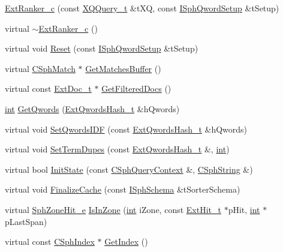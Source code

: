 \begin{DoxyCompactItemize}
\item 
\hyperlink{classExtRanker__c_a4e005df251b91f8f8b4f5cc6a49015ad}{Ext\-Ranker\-\_\-c} (const \hyperlink{structXQQuery__t}{X\-Q\-Query\-\_\-t} \&t\-X\-Q, const \hyperlink{classISphQwordSetup}{I\-Sph\-Qword\-Setup} \&t\-Setup)
\item 
virtual \hyperlink{classExtRanker__c_a49b52daf44c9aa3aeccb3d747aefd079}{$\sim$\-Ext\-Ranker\-\_\-c} ()
\item 
virtual void \hyperlink{classExtRanker__c_a7d94b8c6d73ac70da2efac6aff5874aa}{Reset} (const \hyperlink{classISphQwordSetup}{I\-Sph\-Qword\-Setup} \&t\-Setup)
\item 
virtual \hyperlink{classCSphMatch}{C\-Sph\-Match} $\ast$ \hyperlink{classExtRanker__c_a1e3ba87f4108a2d37a7d6feabe6b634c}{Get\-Matches\-Buffer} ()
\item 
virtual const \hyperlink{structExtDoc__t}{Ext\-Doc\-\_\-t} $\ast$ \hyperlink{classExtRanker__c_a0a7b47ff312794eaf57bce514f64ae78}{Get\-Filtered\-Docs} ()
\item 
\hyperlink{sphinxexpr_8cpp_a4a26e8f9cb8b736e0c4cbf4d16de985e}{int} \hyperlink{classExtRanker__c_a4ac4b90c7223f6ff51fe5dd9aba3794d}{Get\-Qwords} (\hyperlink{sphinxsearch_8cpp_a814fc096e1ffb29d072d79b72b702fe6}{Ext\-Qwords\-Hash\-\_\-t} \&h\-Qwords)
\item 
virtual void \hyperlink{classExtRanker__c_a9538a7ce00ed461791964f7cbe4bd9ba}{Set\-Qwords\-I\-D\-F} (const \hyperlink{sphinxsearch_8cpp_a814fc096e1ffb29d072d79b72b702fe6}{Ext\-Qwords\-Hash\-\_\-t} \&h\-Qwords)
\item 
virtual void \hyperlink{classExtRanker__c_a67136ec62d730896791fa09f46f468a7}{Set\-Term\-Dupes} (const \hyperlink{sphinxsearch_8cpp_a814fc096e1ffb29d072d79b72b702fe6}{Ext\-Qwords\-Hash\-\_\-t} \&, \hyperlink{sphinxexpr_8cpp_a4a26e8f9cb8b736e0c4cbf4d16de985e}{int})
\item 
virtual bool \hyperlink{classExtRanker__c_aa7bb9acb4259f8c5d4098f9dee0d192e}{Init\-State} (const \hyperlink{classCSphQueryContext}{C\-Sph\-Query\-Context} \&, \hyperlink{structCSphString}{C\-Sph\-String} \&)
\item 
virtual void \hyperlink{classExtRanker__c_a15236d1c058e289ce1cf8e9001999c7a}{Finalize\-Cache} (const \hyperlink{classISphSchema}{I\-Sph\-Schema} \&t\-Sorter\-Schema)
\item 
virtual \hyperlink{sphinxint_8h_a988ad80ed2f21b4c66b7fe2bdfa18ad9}{Sph\-Zone\-Hit\-\_\-e} \hyperlink{classExtRanker__c_ae69d99b0d9c3b65c2f56722802a7d6f9}{Is\-In\-Zone} (\hyperlink{sphinxexpr_8cpp_a4a26e8f9cb8b736e0c4cbf4d16de985e}{int} i\-Zone, const \hyperlink{structExtHit__t}{Ext\-Hit\-\_\-t} $\ast$p\-Hit, \hyperlink{sphinxexpr_8cpp_a4a26e8f9cb8b736e0c4cbf4d16de985e}{int} $\ast$p\-Last\-Span)
\item 
virtual const \hyperlink{classCSphIndex}{C\-Sph\-Index} $\ast$ \hyperlink{classExtRanker__c_afef66481ad1c66b1b1e8678210677cf3}{Get\-Index} ()
\end{DoxyCompactItemize}
